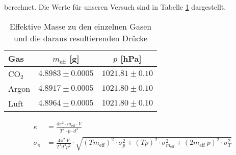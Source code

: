 \documentclass[12pt,a4paper,titlepage,headinclude,bibtotoc]{scrartcl}
\begin{document}
berechnet.
Die Werte für unseren Versuch sind in Tabelle \ref{tab:effm} dargestellt.
\begin{table}[!htbp]
	\centering
	\begin{tabular}{|l|c|c|}
		\hline
		Gas	& $m_\text{eff}$ [g]	& $p$ [hPa]\\\hline\hline
		CO$_2$	& $4.8983 \pm 0.0005$ 	& $1021.81 \pm 0.10$ \\\hline
		Argon	& $4.8917 \pm 0.0005$ 	& $1021.80 \pm 0.10$ \\\hline
		Luft	& $4.8964 \pm 0.0005$ 	& $1021.80 \pm 0.10$ \\\hline
	\end{tabular}
	\caption{Effektive Masse zu den einzelnen Gasen und die daraus resultierenden Drücke} 
	\label{tab:effm}
\end{table}

\begin{align*}
	\kappa&=\frac{4\pi^2 \cdot m_{\text{eff}}\cdot V }{T^{2} \cdot p \cdot d^{4}}\\
	\sigma_{\kappa}&=\frac{4\pi^2 ~ V}{T^{3}  d^{4}  p^{2}} \cdot \sqrt{\left(T  m_{\text{eff}}\right)^2 \cdot \sigma_{p}^{2} + \left(T  p\right)^2 \cdot \sigma_{m_{\text{eff}}}^{2} + \left(2m_{\text{eff}}~p\right)^{2} \cdot \sigma_{T}^{2}}
\end{align*}
\end{document}
